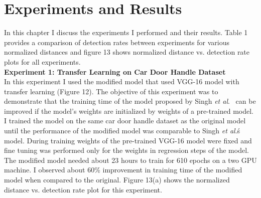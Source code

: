 \documentclass [11pt,letterpaper ,twoside ,openany ]{report}
\begin{document}
    \chapter{Experiments and Results}
    \doublespacing

    In this chapter I discuss the experiments I performed and their results. Table 1 provides a comparison of detection rates between experiments for various normalized distances and figure 13 shows normalized distance vs. detection rate plots for all experiments.\\

    \noindent
    \textbf{Experiment 1: Transfer Learning on Car Door Handle Dataset}\\    
    In this experiment I used the modified model that used VGG-16 model with transfer learning (Figure 12). The objective of this experiment was to demonstrate that the training time of the model proposed by Singh \textit{et al}.\ \cite{Singh_2016_CVPR} can be improved if the model's weights are initialized by weights of a pre-trained model. I trained the model on the same car door handle dataset as the original model until the performance of the modified model was comparable to Singh \textit{et al}.\'s model. During training weights of the pre-trained VGG-16 model were fixed and fine tuning was performed only for the weights in regression steps of the model. The modified model needed about 23 hours to train for 610 epochs on a two GPU machine. I observed about 60\% improvement in training time of the modified model when compared to the original. Figure 13(a) shows the normalized distance vs. detection rate plot for this experiment.
\end{document}
